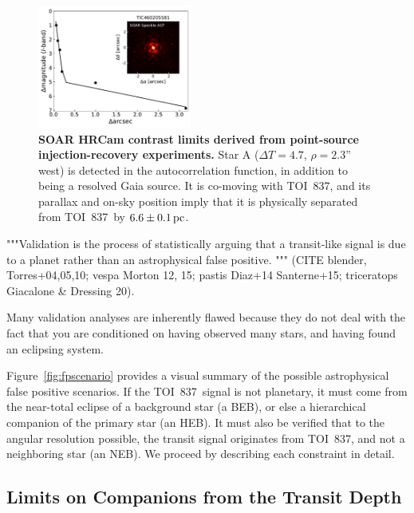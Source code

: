 \documentclass[12pt,twocolumn,tighten]{aastex62}
\newcommand{\tn}{TOI~837} %
\begin{document}
\begin{figure}[t]
	\begin{center}
		\leavevmode
		\includegraphics[width=0.45\textwidth]{f4.pdf}
	\end{center}
	\vspace{-0.7cm}
	\caption{ 
		{\bf SOAR HRCam contrast limits derived from point-source
			injection-recovery experiments.} 
		Star A ($\Delta T=4.7$, $\rho=2.3$'' west) is detected in the
		autocorrelation function, in addition to being a resolved Gaia
		source.
		It is co-moving with \tn, and
		its parallax and on-sky position imply that
		it is physically separated from \tn\ by $6.6\pm 0.1\,{\rm pc}$.
		\label{fig:soar}
	}
\end{figure}



"""Validation is the process of statistically arguing that a
transit-like signal is due to a planet rather than an astrophysical
false positive. """
(CITE blender, Torres+04,05,10; vespa Morton 12, 15; pastis Diaz+14
Santerne+15; triceratops Giacalone \& Dressing 20).

Many validation analyses are inherently flawed because they do
not deal with the fact that you are conditioned on having observed
many stars, and having found an eclipsing system.

Figure~\ref{fig:fpscenario} provides a visual summary of the possible
astrophysical false positive scenarios.  If the \tn\ signal is not
planetary, it must come from the near-total eclipse of a background
star (a BEB), or else a hierarchical companion of the primary star
(an HEB).  It must also be verified that to the angular resolution
possible, the transit signal originates from \tn, and not a
neighboring star (an NEB).
We proceed by describing each constraint in detail.

\subsection{Limits on Companions from the Transit Depth}
\end{document}
